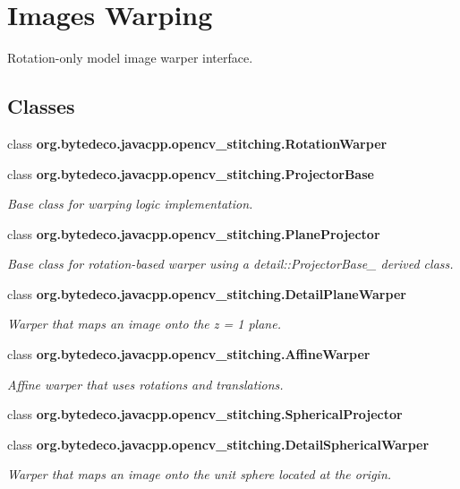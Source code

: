 \hypertarget{group__stitching__warp}{}\section{Images Warping}
\label{group__stitching__warp}


Rotation-\/only model image warper interface.  


\subsection*{Classes}
\begin{DoxyCompactItemize}
\item 
class {\bfseries org.\+bytedeco.\+javacpp.\+opencv\+\_\+stitching.\+Rotation\+Warper}
\item 
class {\bfseries org.\+bytedeco.\+javacpp.\+opencv\+\_\+stitching.\+Projector\+Base}
\begin{DoxyCompactList}\small\item\em Base class for warping logic implementation. \end{DoxyCompactList}\item 
class {\bfseries org.\+bytedeco.\+javacpp.\+opencv\+\_\+stitching.\+Plane\+Projector}
\begin{DoxyCompactList}\small\item\em Base class for rotation-\/based warper using a detail\+::\+Projector\+Base\+\_\+ derived class. \end{DoxyCompactList}\item 
class {\bfseries org.\+bytedeco.\+javacpp.\+opencv\+\_\+stitching.\+Detail\+Plane\+Warper}
\begin{DoxyCompactList}\small\item\em Warper that maps an image onto the z = 1 plane. \end{DoxyCompactList}\item 
class {\bfseries org.\+bytedeco.\+javacpp.\+opencv\+\_\+stitching.\+Affine\+Warper}
\begin{DoxyCompactList}\small\item\em Affine warper that uses rotations and translations. \end{DoxyCompactList}\item 
class {\bfseries org.\+bytedeco.\+javacpp.\+opencv\+\_\+stitching.\+Spherical\+Projector}
\item 
class {\bfseries org.\+bytedeco.\+javacpp.\+opencv\+\_\+stitching.\+Detail\+Spherical\+Warper}
\begin{DoxyCompactList}\small\item\em Warper that maps an image onto the unit sphere located at the origin. \end{DoxyCompactList}\item 

\end{DoxyCompactItemize}
